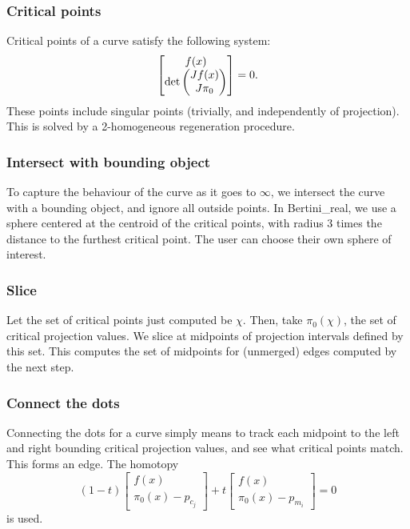 \subsubsection{Critical points}

Critical points of a curve satisfy the following system:
\begin{equation}
\begin{bmatrix}
f(x) \\
\textnormal{det} \begin{pmatrix} Jf(x) \\ J\pi_0 \end{pmatrix}
\end{bmatrix}  = 0. \label{eqn:curve_critpts}
\end{equation}
These points include singular points (trivially, and independently of projection).  This is solved by a 2-homogeneous regeneration procedure.


\subsubsection{Intersect with bounding object}

To capture the behaviour of the curve as it goes to $\infty$, we intersect the curve with a bounding object, and ignore all outside points.  In Bertini\_real, we use a sphere centered at the centroid of the critical points, with radius 3 times the distance to the furthest critical point.  The user can choose their own sphere of interest.


\subsubsection{Slice}


Let the set of critical points just computed be $\chi$.  Then, take $\pi_0(\chi)$, the set of critical projection values.  We slice at midpoints of projection intervals defined by this set.  This computes the set of midpoints for (unmerged) edges computed by the next step.


\subsubsection{Connect the dots}
\label{sec:connect_curve}


Connecting the dots for a curve simply means to track each midpoint to the left and right bounding critical projection values, and see what critical points match.  This forms an edge.  The homotopy 
\begin{equation}
(1-t)
\begin{bmatrix}
f(x) \\
\pi_0(x) - p_{c_j}
\end{bmatrix}
+t
\begin{bmatrix}
f(x) \\
\pi_0(x) - p_{m_i}
\end{bmatrix} = 0\label{eqn:projvalmove}
\end{equation}
is used.

